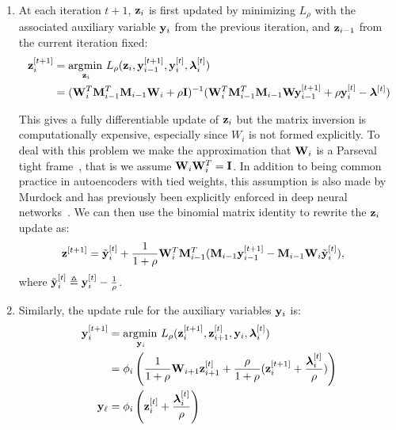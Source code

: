 \begin{enumerate}
\item
 At each iteration $t+1$, $\mathbf{z}_i$ is first updated by minimizing $L_\rho$ with the associated auxiliary variable $\mathbf{y}_i$ from the previous iteration, and $\mathbf{z}_{i-1}$ from the current iteration fixed:
  \begin{equation}
    \begin{aligned}
      \mathbf{z}^{[t+1]}_i & = \operatorname*{\arg\!\min\,}_{\mathbf{z}_i} L_\rho(\mathbf{z}_i, \mathbf{y}^{[t+1]}_{i-1}, \mathbf{y}^{[t]}_i, \bm{\lambda}_i^{[t]})\\
      &= (\mathbf{W}_i^T\mathbf{M}_{i-1}^T\mathbf{M}_{i-1}\mathbf{W}_i + \rho \mathbf{I})^{-1}(\mathbf{W}_{i}^T\mathbf{M}_{i-1}^T\mathbf{M}_{i-1}\mathbf{W}\mathbf{y}^{[t+1]}_{i-1} + \rho \mathbf{y}^{[t]}_{i} - \bm{\lambda}^{[t]})
    \end{aligned}
    \label{eq:wupdate1}  
  \end{equation}

  This gives a fully differentiable update of $\mathbf{z}_i$ but the matrix inversion is computationally expensive, especially since $W_i$ is not formed explicitly. To deal with this problem we make the approximation that $\mathbf{W}_i$ is a Parseval tight frame~\cite{murdock}, that is we assume $\mathbf{W}_i\mathbf{W}_i^T = \mathbf{I}$. In addition to being common practice in autoencoders with tied weights, this assumption is also made by Murdock \etal and has previously been explicitly enforced in deep neural networks~\cite{moustapha}. We can then use the binomial matrix identity to rewrite the $\mathbf{z}_i$ update as:
  \begin{equation}
    \begin{aligned}
      \mathbf{z}^{[t+1]} &= \tilde{\mathbf{y}}_i^{[t]} + \frac{1}{1 + \rho}\mathbf{W}^T_i\mathbf{M}_{i-1}^T(\mathbf{M}_{i-1}\mathbf{y}^{[t+1]}_{i-1} - \mathbf{M}_{i-1}\mathbf{W}_i\tilde{\mathbf{y}}^{[t]}_i),
    \end{aligned}\label{eq:zupdate}
  \end{equation}
  where $\tilde{\mathbf{y}}_i^{[t]} \triangleq \mathbf{y}_i^{[t]} - \frac{1}{\rho}$.
\item
 Similarly, the update rule for the auxiliary variables $\mathbf{y}_i$ is:
  \begin{equation}
    \begin{aligned}
      \mathbf{y}_i^{[t+1]} & = \operatorname*{\arg\!\min\,}_{\mathbf{y}_i} L_\rho(\mathbf{z}^{[t+1]}_i, \mathbf{z}^{[t]}_{i+1}, \mathbf{y}_i, \bm{\lambda}_i^{[t]})\\
      &= \phi_i\left(\frac{1}{1+\rho}\mathbf{W}_{i+1}\mathbf{z}^{[t]}_{i+1} + \frac{\rho}{1+\rho}(\mathbf{z}^{[t+1]}_i + \frac{\bm{\lambda}_i^{[t]}}{\rho})\right)\\
      \mathbf{y}_{\ell} &= \phi_i\left(\mathbf{z}_i^{[t]} + \frac{\bm{\lambda}_i^{[t]}}{\rho}\right)
    \end{aligned}\label{eq:yupdate}
  \end{equation}


\end{enumerate}

